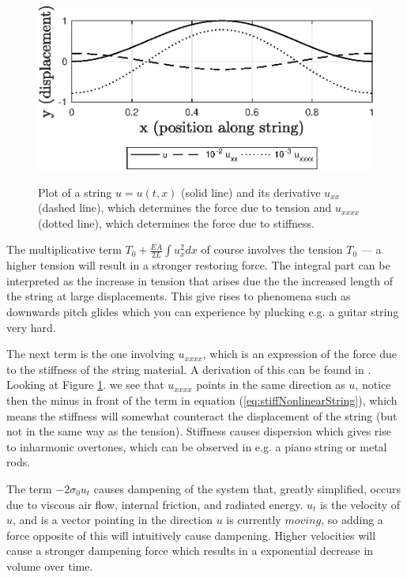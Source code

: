 \documentclass{article}
\begin{document}
\begin{figure}[h]
  \includegraphics[width=\linewidth]{diffplot.eps}
  \label{fig:diffplot}
  \caption{Plot of a string $u = u(t, x)$ (solid line) and its derivative $u_{xx}$ (dashed line), which determines the force due to tension and $u_{xxxx}$ (dotted line), which determines the force due to stiffness.}
\end{figure}

The multiplicative term $T_0 + \frac{E A}{2L} \int u_x^2 dx$ of course involves the tension $T_0$ --- a higher tension will result in a stronger restoring force.
The integral part can be interpreted as the increase in tension that arises due the the increased length of the string at large displacements\cite[Chapter~5]{fletcher_physics_1998}.
This give rises to phenomena such as downwards pitch glides which you can experience by plucking e.g. a guitar string very hard.

The next term is the one involving $u_{xxxx}$, which is an expression of the force due to the stiffness of the string material.
A derivation of this can be found in \cite[Chapter~2]{fletcher_physics_1998}.
Looking at Figure \ref{fig:diffplot}. we see that $u_{xxxx}$ points in the same direction as $u$, notice then the minus in front of the term in equation (\ref{eq:stiffNonlinearString}), which means the stiffness will somewhat counteract the displacement of the string (but not in the same way as the tension).
Stiffness causes dispersion which gives rise to inharmonic overtones, which can be observed in e.g. a piano string or metal rods.

The term $-2 \sigma_0 u_t$ causes dampening of the system that, greatly simplified, occurs due to viscous air flow, internal friction, and radiated energy\cite[Chapter~2]{fletcher_physics_1998}. 
$u_t$ is the velocity of $u$, and is a vector pointing in the direction $u$ is currently $moving$, so adding a force opposite of this will intuitively cause dampening.
Higher velocities will cause a stronger dampening force which results in a exponential decrease in volume over time.
\end{document}

